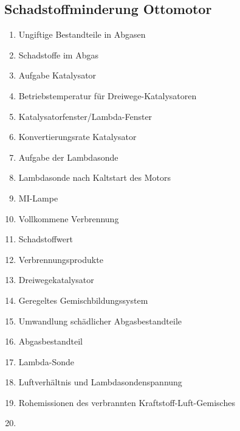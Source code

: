\subsection{Schadstoffminderung
Ottomotor}\label{schadstoffminderung-ottomotor}

\begin{enumerate}
\item
  Ungiftige Bestandteile in Abgasen\\
\item
  Schadstoffe im Abgas\\
\item
  Aufgabe Katalysator\\
\item
  Betriebstemperatur für Dreiwege-Katalysatoren\\
\item
  Katalysatorfenster/Lambda-Fenster\\
\item
  Konvertierungsrate Katalysator\\
\item
  Aufgabe der Lambdasonde\\
\item
  Lambdasonde nach Kaltstart des Motors\\
\item
  MI-Lampe\\
\item
  Vollkommene Verbrennung\\
\item
  Schadstoffwert\\
\item
  Verbrennungsprodukte\\
\item
  Dreiwegekatalysator\\
\item
  Geregeltes Gemischbildungssystem\\
\item
  Umwandlung schädlicher Abgasbestandteile\\
\item
  Abgasbestandteil\\
\item
  Lambda-Sonde\\
\item
  Luftverhältnis und Lambdasondenspannung\\
\item
  Rohemissionen des verbrannten Kraftstoff-Luft-Gemisches\\
\item

\end{enumerate}
